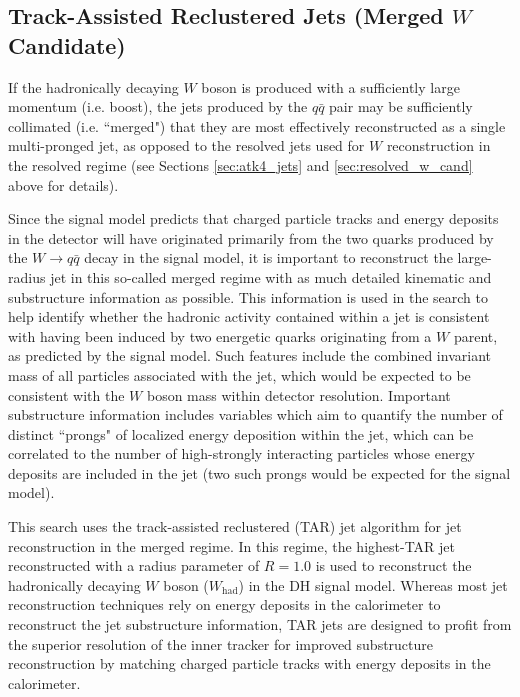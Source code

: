 \subsection{Track-Assisted Reclustered Jets (Merged \(W\) Candidate)}
\label{sec:TAR_jets}

If the hadronically decaying \(W\) boson is produced with a sufficiently large momentum (i.e. boost), the jets produced by the \(q\bar{q}\) pair may be sufficiently collimated (i.e. ``merged") that they are most effectively reconstructed as a single multi-pronged \largeR jet, as opposed to the resolved \smallR jets used for \(W\) reconstruction in the resolved regime (see Sections \ref{sec:atk4_jets} and \ref{sec:resolved_w_cand} above for details). 

Since the signal model predicts that charged particle tracks and energy deposits in the detector will have originated primarily from the two quarks produced by the \(W\rightarrow q\bar{q}\) decay in the signal model, it is important to reconstruct the large-radius jet in this so-called merged regime with as much detailed kinematic and substructure information as possible. This information is used in the search to help identify whether the hadronic activity contained within a \largeR jet is consistent with having been induced by two energetic quarks originating from a \(W\) parent, as predicted by the signal model. Such features include the combined invariant mass \mTAR of all particles associated with the jet, which would be expected to be consistent with the \(W\) boson mass within detector resolution. Important substructure information includes variables which aim to quantify the number of distinct ``prongs" of localized energy deposition within the jet, which can be correlated to the number of high-\pt strongly interacting particles whose energy deposits are included in the jet (two such prongs would be expected for the signal model). 

This search uses the track-assisted reclustered (TAR) jet algorithm \cite{ATL-PHYS-PUB-2018-012} for \largeR jet reconstruction in the merged regime. In this regime, the highest-\pt TAR jet reconstructed with a radius parameter of \(R=1.0\) is used to reconstruct the hadronically decaying \(W\) boson (\(W_\text{had}\)) in the DH signal model. Whereas most \largeR jet reconstruction techniques rely on energy deposits in the calorimeter to reconstruct the jet substructure information, TAR jets are designed to profit from the superior resolution of the inner tracker for improved substructure reconstruction by matching charged particle tracks with energy deposits in the calorimeter. 

